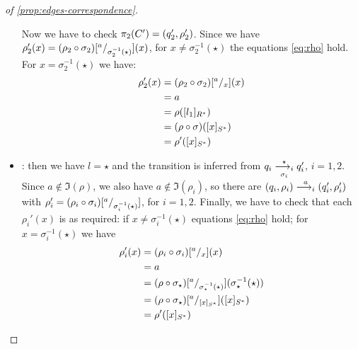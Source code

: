 \begin{proof}[of \cref{prop:edges-correspondence}]
\begin{itemize}
\begin{itemize}
	\end{itemize}
	Now we have to check $\pi_2(C') = (q_2',\rho_2')$. Since we have $\rho'_2(x) = (\rho_2 \circ \sigma_2)[{}^{a}/_{\sigma_2^{-1}(\star)}](x)$, for $x \neq \sigma_2^{-1}(\star)$ the equations \eqref{eq:rho} hold. For $x =  \sigma_2^{-1}(\star)$ we have:
	\begin{align*}
		\rho'_2(x) &= (\rho_2 \circ \sigma_2)[{}^{a}/_{x}](x) \\
		&= a \\
		&= \rho([l_1]_{R^*}) \\
		&= (\rho \circ \sigma)([x]_{S^*}) \\
		& = \rho'([x]_{S^*})
	\end{align*}	


	\item \allrule: then we have $l=\star$ and the transition is inferred from $q_i \overset{\star}{\underset{\sigma_i}{\longrightarrow_{i}}} q_i'$, $i=1,2$. Since $a \notin \Im(\rho)$, we also have $a \notin \Im(\rho_i)$, so there are $(q_i,\rho_i) \overset{a}{\longrightarrow_{i}} (q_i',\rho_i')$ with $\rho_i' = (\rho_i \circ \sigma_i)[{}^{a}/_{\sigma^{-1}_i(\star)}]$, for $i=1,2$. Finally, we have to check that each $\rho_i'(x)$ is as required: if $x \neq\sigma_i^{-1}(\star)$ equations \eqref{eq:rho} hold; for $x=\sigma_i^{-1}(\star)$ we have
	\begin{align*}
		\rho'_i(x) &= (\rho_i \circ \sigma_i)[{}^{a}/_{x}](x) \\
		&= a \\
		&= (\rho \circ \sigma_\star) [{}^{a}/_{\sigma_\star^{-1}(\star)}](\sigma_\star^{-1}(\star)) \\
		&= (\rho \circ \sigma_\star) [{}^{a}/_{[x]_{S^*}}]([x]_{S^*}) \\
		&= \rho'([x]_{S^*})
	\end{align*}
	
\end{itemize} 



\end{proof}
